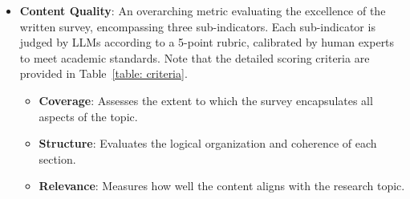\begin{itemize}
   \item \textbf{Content Quality}: An overarching metric evaluating the excellence of the written survey, encompassing three sub-indicators. Each sub-indicator is judged by LLMs according to a 5-point rubric, calibrated by human experts to meet academic standards. Note that the detailed scoring criteria are provided in Table~\ref{table: criteria}.
    \begin{itemize}
    \item \textbf{Coverage}: Assesses the extent to which the survey encapsulates all aspects of the topic.
    \item \textbf{Structure}: Evaluates the logical organization and coherence of each section.
    \item \textbf{Relevance}: Measures how well the content aligns with the research topic.
    \end{itemize}
    
\end{itemize} 

